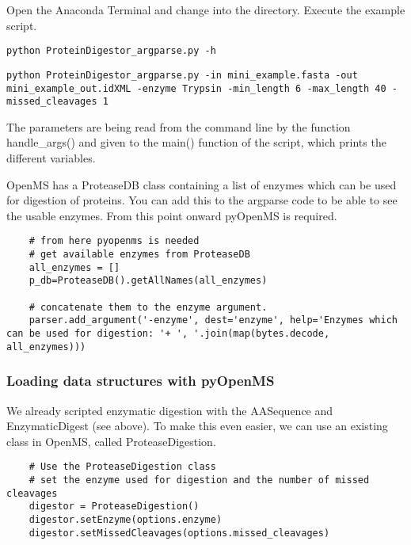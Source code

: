 {\noindent Open the Anaconda Terminal and change into the  directory. Execute the example script. 
\begin{listing}
\begin{verbatim}
python ProteinDigestor_argparse.py -h
\end{verbatim}
\end{listing}

\begin{listing}
\begin{verbatim}
python ProteinDigestor_argparse.py -in mini_example.fasta -out mini_example_out.idXML -enzyme Trypsin -min_length 6 -max_length 40 -missed_cleavages 1
\end{verbatim}
\end{listing}

\noindent The parameters are being read from the command line by the function handle\_args() and given to the main() function of the script, which prints the different variables.

\noindent OpenMS has a ProteaseDB  class containing a list of enzymes which can be used for digestion of proteins. You can add this to the argparse code to be able to see the usable enzymes. From this point onward pyOpenMS is required. 
\begin{listing}
\begin{verbatim}
    # from here pyopenms is needed
    # get available enzymes from ProteaseDB
    all_enzymes = []
    p_db=ProteaseDB().getAllNames(all_enzymes)
    
    # concatenate them to the enzyme argument.
    parser.add_argument('-enzyme', dest='enzyme', help='Enzymes which can be used for digestion: '+ ', '.join(map(bytes.decode, all_enzymes)))
\end{verbatim}
\end{listing}

\subsubsection{Loading data structures with pyOpenMS}
We already scripted enzymatic digestion with the AASequence and EnzymaticDigest (see above). To make this even easier, we can use an existing class in OpenMS, called ProteaseDigestion.

\begin{listing}
\begin{verbatim}
    # Use the ProteaseDigestion class
    # set the enzyme used for digestion and the number of missed cleavages
    digestor = ProteaseDigestion()
    digestor.setEnzyme(options.enzyme)
    digestor.setMissedCleavages(options.missed_cleavages)
    

\end{verbatim}
\end{listing}}
